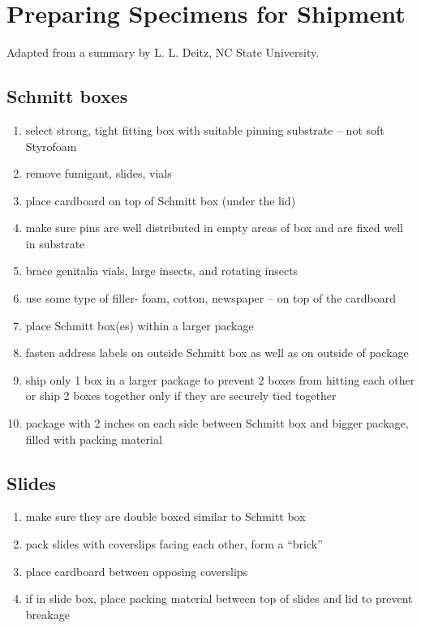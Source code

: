 \documentclass[letterpaper, 11pt]{article}
\begin{document}
\section{Preparing Specimens for Shipment}

Adapted from a summary by L. L. Deitz, NC State University.%
 

\subsection{Schmitt boxes}

\begin{enumerate}
\item select strong, tight fitting box with suitable pinning substrate – not soft Styrofoam
\item remove fumigant, slides, vials
\item place cardboard on top of Schmitt box (under the lid)
\item make sure pins are well distributed in empty areas of box and are fixed well in substrate
\item brace genitalia vials, large insects, and rotating insects
\item use some type of filler- foam, cotton, newspaper – on top of the cardboard
\item place Schmitt box(es) within a larger package
\item fasten address labels on outside Schmitt box as well as on outside of package
\item ship only 1 box in a larger package to prevent 2 boxes from hitting each other or ship 2 boxes together only if they are securely tied together
\item package with 2 inches on each side between Schmitt box and bigger package, filled with packing material
\end{enumerate}

\subsection{Slides}

\begin{enumerate}
\item make sure they are double boxed similar to Schmitt box
\item pack slides with coverslips facing each other, form a “brick”
\item place cardboard between opposing coverslips
\item if in slide box, place packing material between top of slides and lid to prevent breakage
\end{enumerate}
\end{document}
